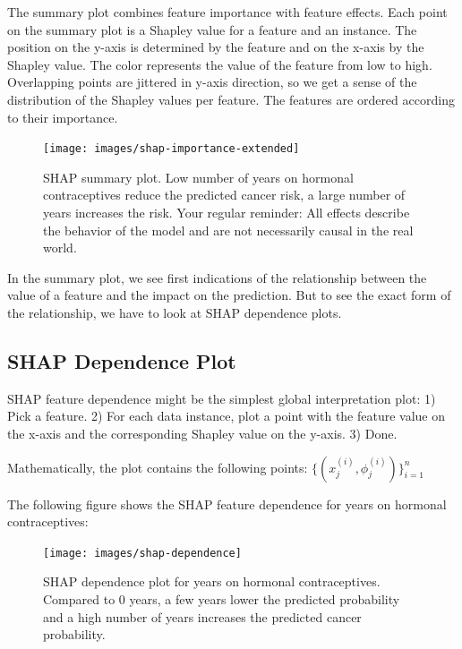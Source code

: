 \documentclass[12pt,]{krantz}
\begin{document}
The summary plot combines feature importance with feature effects. Each
point on the summary plot is a Shapley value for a feature and an
instance. The position on the y-axis is determined by the feature and on
the x-axis by the Shapley value. The color represents the value of the
feature from low to high. Overlapping points are jittered in y-axis
direction, so we get a sense of the distribution of the Shapley values
per feature. The features are ordered according to their importance.

\begin{figure}

{\centering \texttt{[image: images/shap-importance-extended]} 

}

\caption{SHAP summary plot. Low number of years on hormonal contraceptives reduce the predicted cancer risk, a large number of years increases the risk. Your regular reminder: All effects describe the behavior of the model and are not necessarily causal in the real world.}\label{fig:unnamed-chunk-46}
\end{figure}

In the summary plot, we see first indications of the relationship
between the value of a feature and the impact on the prediction. But to
see the exact form of the relationship, we have to look at SHAP
dependence plots.

\subsection{SHAP Dependence Plot}\label{shap-dependence-plot}

SHAP feature dependence might be the simplest global interpretation
plot: 1) Pick a feature. 2) For each data instance, plot a point with
the feature value on the x-axis and the corresponding Shapley value on
the y-axis. 3) Done.

Mathematically, the plot contains the following points:
\(\{(x_j^{(i)},\phi_j^{(i)})\}_{i=1}^n\)

The following figure shows the SHAP feature dependence for years on
hormonal contraceptives:

\begin{figure}

{\centering \texttt{[image: images/shap-dependence]} 

}

\caption{SHAP dependence plot for years on hormonal contraceptives. Compared to 0 years, a few years lower the predicted probability and a high number of years increases the predicted cancer probability.}\label{fig:unnamed-chunk-47}
\end{figure}
\end{document}
